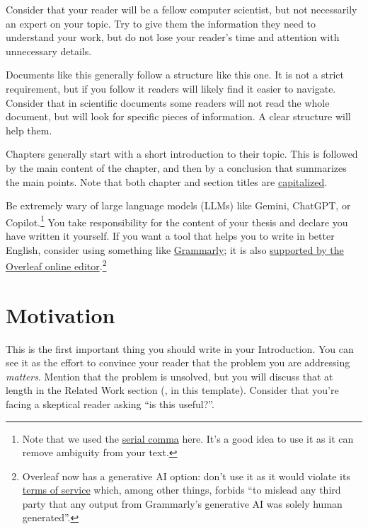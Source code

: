 Consider that your reader will be a fellow computer scientist, but not necessarily an expert
on your topic. Try to give them the information they need to understand your work, but
do not lose your reader's time and attention with unnecessary details.

Documents like this generally follow a structure like this one. It is not a strict
requirement, but if you follow it readers will likely find it easier to navigate.
Consider that in scientific documents some readers will not read the whole document,
but will look for specific pieces of information. A clear structure will help them.

Chapters generally start with a short introduction to their topic. This is followed by the main content of the chapter, and then by a conclusion
that summarizes the main points. Note that both chapter and section titles are
\href{https://www.grammarly.com/blog/capitalization-in-the-titles/}{capitalized}.

Be extremely wary of large language models (LLMs) like Gemini, ChatGPT, or
Copilot.\footnote{Note that we used the \href{https://en.wikipedia.org/wiki/Serial_comma}{serial comma} here. It's a good idea to use it as it can remove ambiguity from your text.} You take
responsibility for the content of your thesis and declare you have written it yourself.
If you want a tool that helps you to write in better English, consider using something like
\href{https://grammarly.com}{Grammarly}; it is also \href{https://www.overleaf.com/learn/how-to/Use_Grammarly_with_Overleaf}{supported by the Overleaf online \latex editor}.\footnote{Overleaf now has a generative AI option: don't use it as it would violate its \href{https://www.grammarly.com/terms}{terms of service} which, among other things, forbids ``to mislead any third party that any output from Grammarly’s generative AI was solely human generated''.}

\section{Motivation}

This is the first important thing you should write in your Introduction.
You can see it as the effort to convince your reader that the problem you are addressing
\emph{matters}. Mention that the problem is unsolved, but you will discuss that at
length in the Related Work section (, in this template). Consider that
you're facing a skeptical reader asking ``is this useful?''.

